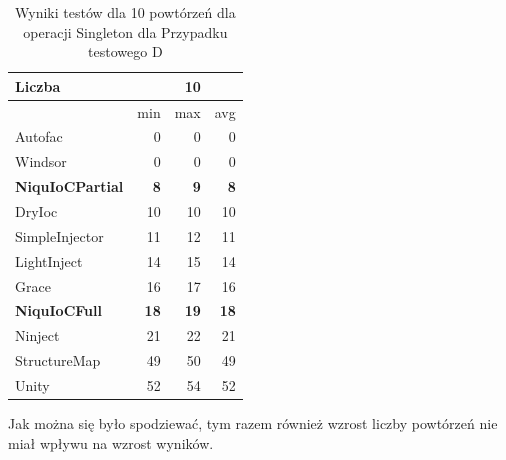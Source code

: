 \documentclass[12pt]{article}
\begin{document}
\begin{table}[H]
\captionsetup{belowskip=0pt,aboveskip=0pt}
\begin{center}
\begin{small}
	\begin{tabular}{ | l | r r r | }
    		\hline
Liczba & & 10 & \\ \hline
 & min & max & avg \\ \hline
Autofac & 0 & 0 & 0 \\ \hline
Windsor & 0 & 0 & 0 \\ \hline
\textbf{NiquIoCPartial} & \textbf{8} & \textbf{9} & \textbf{8} \\ \hline
DryIoc & 10 & 10 & 10 \\ \hline
SimpleInjector & 11 & 12 & 11 \\ \hline
LightInject & 14 & 15 & 14 \\ \hline
Grace & 16 & 17 & 16 \\ \hline
\textbf{NiquIoCFull} & \textbf{18} & \textbf{19} & \textbf{18} \\ \hline
Ninject & 21 & 22 & 21 \\ \hline
StructureMap & 49 & 50 & 49 \\ \hline
Unity & 52 & 54 & 52 \\ \hline
  	\end{tabular}
\end{small}
\end{center}
\caption{Wyniki testów dla 10 powtórzeń dla operacji Singleton dla Przypadku testowego D}
\label{TestCaseD_Singleton10}
\end{table}
Jak można się było spodziewać, tym razem również wzrost liczby powtórzeń nie miał wpływu na wzrost wyników.
\end{document}

